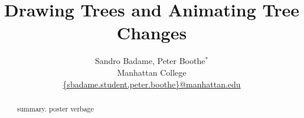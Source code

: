 \documentclass{article}
\title{Drawing Trees and Animating Tree Changes}
\author{Sandro Badame, Peter Boothe$^*$\\
 Manhattan College\\
\url{{sbadame.student,peter.boothe}@manhattan.edu}}
\begin{document}
\maketitle

\begin{abstract}
summary.  poster verbage
\end{abstract}
\end{document}
